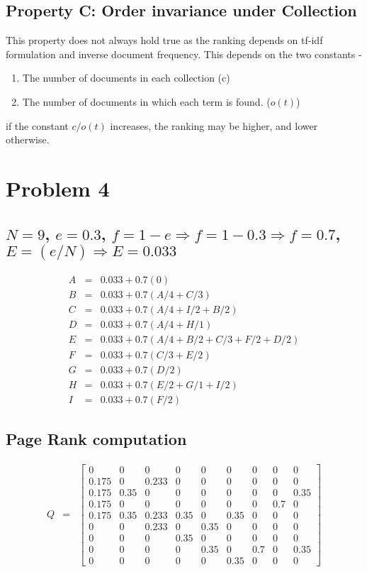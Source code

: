 \documentclass{article}
\begin{document}
\subsection{\textbf{Property C: Order invariance under Collection}} 

This property does not always hold true as the ranking depends on tf-idf formulation and inverse document frequency. This depends on the two constants - 
\begin{enumerate}
	\item The number of documents in each collection (c)
	\item The number of documents in which each term is found. ($o(t)$)
\end{enumerate} 

if the constant $c/o(t)$ increases, the ranking may be higher, and lower otherwise.



\section[D]{Problem 4}
\subsection{ $N = 9$, $e = 0.3$, $f = 1 - e \Rightarrow f = 1 - 0.3 \Rightarrow f = 0.7$, $E = (e/N) \Rightarrow E = 0.033$}
\[
\begin{array}{rcl}A & = & 0.033 + 0.7(0)\\ B & = & 0.033 + 0.7(A/4 + C/3) \\ C & = & 0.033 + 0.7(A/4 + I/2 + B/2) \\ D & = & 0.033 + 0.7(A/4 + H/1) \\ E & = &0.033 + 0.7(A/4+B/2 + C/3 + F/2 + D/2) \\ F & = & 0.033 + 0.7(C/3 + E/2) \\ G & = & 0.033 + 0.7(D/2) \\ H & = & 0.033 + 0.7(E/2 + G/1 + I/2) \\ I & = & 0.033 + 0.7(F/2)
\end{array}
\]
\subsection{\textbf{Page Rank computation}}
\[
\begin{array}{lcl}Q & = &
\begin{bmatrix} 0 & 0 & 0 & 0 & 0 & 0 & 0 & 0 & 0 \\ 0.175 & 0 & 0.233 & 0 & 0 & 0 & 0 & 0 & 0 \\ 0.175 & 0. 35 & 0 & 0 & 0 & 0 & 0 & 0 & 0.35 \\ 0.175 & 0 & 0 & 0 & 0& 0 & 0 & 0.7 & 0 \\ 0.175 & 0.35 & 0.233 & 0.35 & 0 & 0.35 & 0 & 0 & 0 \\ 0 & 0 & 0.233 & 0 & 0.35 & 0 & 0 & 0 & 0 \\ 0 & 0 & 0 & 0.35 & 0 & 0 & 0 & 0 & 0 \\ 0 & 0 & 0 & 0 & 0.35 & 0 & 0.7 & 0 & 0.35 \\ 0 & 0 & 0 & 0 & 0 & 0.35 & 0 & 0 & 0
\end{bmatrix}
\end{array}
\]
\end{document}
